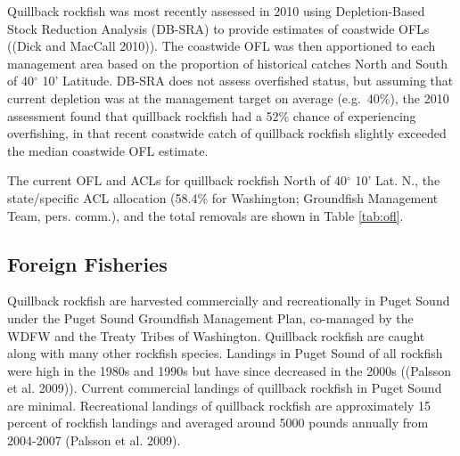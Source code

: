 \documentclass[11pt,
  english,
  a4paper,
]{article}
\begin{document}
\leavevmode\tagmcend\tagstructend\par


Quillback rockfish was most recently assessed in 2010 using Depletion-Based Stock Reduction Analysis (DB-SRA) to provide estimates of coastwide OFLs ({(Dick and MacCall 2010)\leavevmode\tagmcend\tagstructend}). The coastwide OFL was then apportioned to each management area based on the proportion of historical catches North and South of 40{\(^\circ\)\leavevmode\tagmcend\tagstructend} 10' Latitude. DB-SRA does not assess overfished status, but assuming that current depletion was at the management target on average (e.g.~40\%), the 2010 assessment found that quillback rockfish had a 52\% chance of experiencing overfishing, in that recent coastwide catch of quillback rockfish slightly exceeded the median coastwide OFL estimate.

\leavevmode\tagmcend\tagstructend\par


The current OFL and ACLs for quillback rockfish North of 40{\(^\circ\)\leavevmode\tagmcend\tagstructend} 10' Lat. N., the state/specific ACL allocation (58.4\% for Washington; Groundfish Management Team, pers. comm.), and the total removals are shown in Table \ref{tab:ofl}.

\leavevmode\tagmcend\tagstructend\par


\hypertarget{foreign-fisheries}{%
\subsection{Foreign Fisheries}\label{foreign-fisheries}}

\leavevmode\tagmcend\tagstructend


Quillback rockfish are harvested commercially and recreationally in Puget Sound under the Puget Sound Groundfish Management Plan, co-managed by the WDFW and the Treaty Tribes of Washington. Quillback rockfish are caught along with many other rockfish species. Landings in Puget Sound of all rockfish were high in the 1980s and 1990s but have since decreased in the 2000s ({(Palsson et al. 2009)\leavevmode\tagmcend\tagstructend}). Current commercial landings of quillback rockfish in Puget Sound are minimal. Recreational landings of quillback rockfish are approximately 15 percent of rockfish landings and averaged around 5000 pounds annually from 2004-2007 {(Palsson et al. 2009)\leavevmode\tagmcend\tagstructend}.
\end{document}
